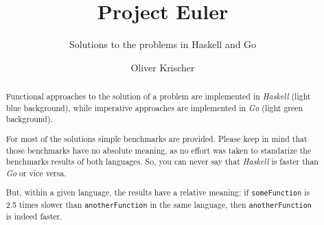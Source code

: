 \documentclass{scrreprt}
\numberwithin{equation}{chapter}
\begin{document}
\title{Project Euler}
\author{Oliver Krischer}
\subtitle{Solutions to the problems in Haskell and Go}
\maketitle
\begin{abstract}
  Functional approaches to the solution of a problem are implemented in \emph{Haskell} (light blue background), while imperative approaches are implemented in \emph{Go} (light green background).

  For most of the solutions simple benchmarks are provided.
  Please keep in mind that those benchmarks have no absolute meaning, as no effort was taken to standarize the benchmarks results of both languages.
  So, you can never say that \emph{Haskell} is faster than \emph{Go} or vice versa.

  But, within a given language, the results have a relative meaning: if \texttt{someFunction} is 2.5 times slower than \texttt{anotherFunction} in the same language, then \texttt{anotherFunction} is indeed faster.
\end{abstract}
\tableofcontents





\end{document}
